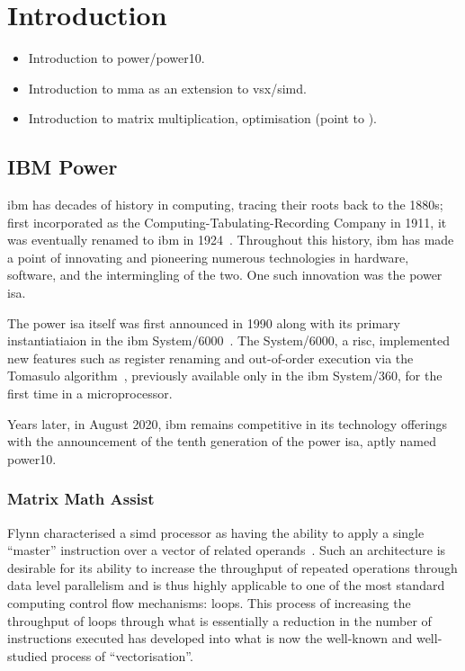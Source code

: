 \documentclass[\main/thesis.tex]{subfiles}
\begin{document}
\chapter{Introduction}
\label{cha:intro}

\begin{itemize}
  \item Introduction to \gls{power}/\gls{power10}.
  \item Introduction to \gls{mma} as an extension to \gls{vsx}/\gls{simd}.
  \item Introduction to matrix multiplication, optimisation (point to ).
\end{itemize}

\section{IBM Power}
\Gls{ibm} has decades of history in computing, tracing their roots back to the 1880s; first incorporated as the Computing-Tabulating-Recording Company in 1911, it was eventually renamed to \gls{ibm} in 1924~\autocite{ibmarchive}.
Throughout this history, \gls{ibm} has made a point of innovating and pioneering numerous technologies in hardware, software, and the intermingling of the two.
One such innovation was the \gls{power} \gls{isa}.

The \gls{power} \gls{isa} itself was first announced in 1990 along with its primary instantiatiaion in the \gls{ibm} System/6000~\autocite{montoye1990design}.
The System/6000, a \gls{risc}, implemented new features such as register renaming and out-of-order execution via the Tomasulo algorithm~\autocite{tomasulo1967efficient}, previously available only in the \gls{ibm} System/360, for the first time in a microprocessor.

Years later, in August 2020, \gls{ibm} remains competitive in its technology offerings with the announcement of the tenth generation of the \gls{power} \gls{isa}, aptly named \gls{power10}.

\subsection{Matrix Math Assist}
\label{sec:mmaintro}
Flynn characterised a \gls{simd} processor as having the ability to apply a single ``master'' instruction over a vector of related operands~\autocite{flynn1972some}.
Such an architecture is desirable for its ability to increase the throughput of repeated operations through data level parallelism and is thus highly applicable to one of the most standard computing control flow mechanisms: loops.
This process of increasing the throughput of loops through what is essentially a reduction in the number of instructions executed has developed into what is now the well-known and well-studied process of ``vectorisation''.
\end{document}
